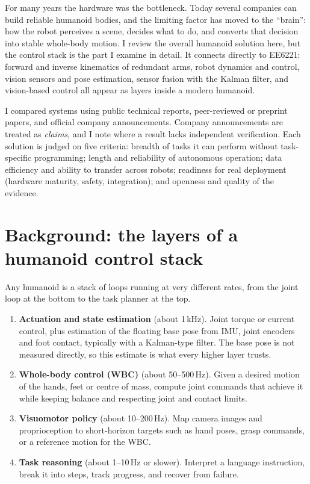 \documentclass[11pt,a4paper]{article}
\begin{document}
For many years the hardware was the bottleneck.  Today several companies can
build reliable humanoid bodies, and the limiting factor has moved to the
``brain'': how the robot perceives a scene, decides what to do, and converts
that decision into stable whole-body motion.  I review the overall humanoid
solution here, but the control stack is the part I examine in detail.  It
connects directly to EE6221: forward and inverse kinematics of redundant arms,
robot dynamics and control, vision sensors and pose estimation, sensor fusion
with the Kalman filter, and vision-based control all appear as layers inside a
modern humanoid.

I compared systems using public technical reports, peer-reviewed or preprint
papers, and official company announcements.  Company announcements are treated
as \emph{claims}, and I note where a result lacks independent verification.
Each solution is judged on five criteria: breadth of tasks it can perform
without task-specific programming; length and reliability of autonomous
operation; data efficiency and ability to transfer across robots; readiness for
real deployment (hardware maturity, safety, integration); and openness and
quality of the evidence.

\section{Background: the layers of a humanoid control stack}

Any humanoid is a stack of loops running at very different rates, from the
joint loop at the bottom to the task planner at the top.

\begin{enumerate}[label=\textbf{L\arabic*}]
  \item \textbf{Actuation and state estimation} (about 1\,kHz).  Joint torque
  or current control, plus estimation of the floating base pose from IMU,
  joint encoders and foot contact, typically with a Kalman-type filter.  The
  base pose is not measured directly, so this estimate is what every higher
  layer trusts.
  \item \textbf{Whole-body control (WBC)} (about 50--500\,Hz).  Given a
  desired motion of the hands, feet or centre of mass, compute joint commands
  that achieve it while keeping balance and respecting joint and contact
  limits.
  \item \textbf{Visuomotor policy} (about 10--200\,Hz).  Map camera images and
  proprioception to short-horizon targets such as hand poses, grasp
  commands, or a reference motion for the WBC.
  \item \textbf{Task reasoning} (about 1--10\,Hz or slower).  Interpret a
  language instruction, break it into steps, track progress, and recover from
  failure.
\end{enumerate}
\end{document}
